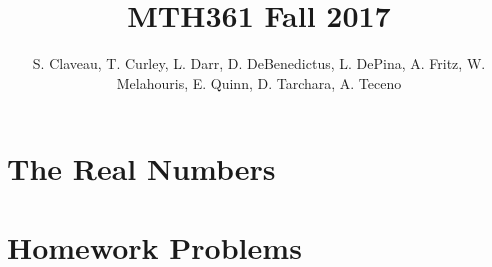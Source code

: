 \documentclass[12pt]{amsbook}
\theoremstyle{plain}
\numberwithin{section}{chapter}
\begin{document}
\title{MTH361 Fall 2017}
\maketitle
\author{S. Claveau, T. Curley, L. Darr, D. DeBenedictus, L. DePina, A. Fritz, W. Melahouris, E. Quinn, D. Tarchara, A. Teceno}
\setcounter{tocdepth}{4} 
\tableofcontents
\mainmatter 
\chapter{The Real Numbers}

\chapter{Homework Problems}
\end{document}
